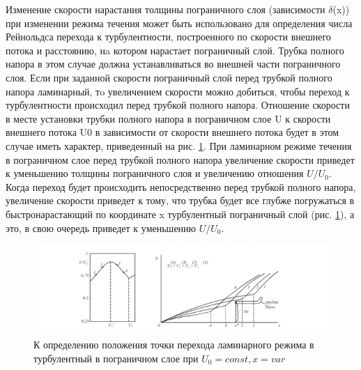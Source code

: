 \documentclass[12pt,a4paper]{article}
\begin{document}
\par Изменение скорости нарастания толщины пограничного слоя (зависимости $\delta$(x)) при изменении режима течения может быть использовано для определения числа Рейнольдса перехода к турбулентности, построенного по скорости внешнего потока и расстоянию, нa котором нарастает пограничный слой. Трубка полного напора в этом случае должна устанавливаться во внешней части пограничного слоя. Если при заданной скорости пограничный слой перед трубкой полного напора ламинарный, тo увеличением скорости можно добиться, чтобы переход к турбулентности происходил перед трубкой полного напора. Отношение скорости в месте установки трубки полного напора в пограничном слое U к скорости внешнего потока U0 в зависимости от скорости внешнего потока будет в этом случае иметь характер, приведенный на рис. \ref{pic5}. При ламинарном режиме течения в пограничном слое перед трубкой полного напора увеличение скорости приведет к уменьшению толщины пограничного слоя и увеличению отношения $U/U_0$. Когда переход будет происходить непосредственно перед трубкой полного напора, увеличение скорости приведет к тому, что трубка будет все глубже погружаться в быстронарастающий по координате x турбулентный пограничный слой (рис. \ref{pic5}), а это, в свою очередь приведет к уменьшению $U/U_0$.
\begin{figure}[h!]
    \centering
    \includegraphics[width = 1.0 \textwidth]{5.png}
    \caption{К определению положения точки перехода ламинарного режима в турбулентный в пограничном слое при $U_0= const, x = var$}
    \label{pic5}
\end{figure}

\newpage
\end{document}
